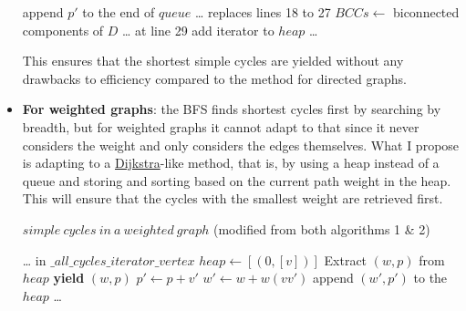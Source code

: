 \begin{itemize}
\begin{algorithm}[H]
\begin{algorithmic}
                  \State append $p'$ to the end of $queue$
                  \EndIf
                  \EndFor
                  \State \ldots
                  \State replaces lines 18 to 27
                  \State $BCCs \gets$ biconnected components of $D$
                  \State \ldots
                  \State at line 29
                  \State add iterator  to $heap$
                  \EndFor
                  \State \ldots
              \end{algorithmic}
          \end{algorithm}
          This ensures that the shortest simple cycles are yielded without any drawbacks to efficiency compared to the method for directed graphs.

    \item \textbf{For weighted graphs}:
          the BFS finds shortest cycles first by searching by breadth,
          but for weighted graphs it cannot adapt
          to that since it never considers the weight and only considers
          the edges themselves. What I propose is adapting to a \href{https://en.wikipedia.org/wiki/Dijkstra's_algorithm}{Dijkstra}-like method,
          that is, by using a heap instead of a queue and storing
          and sorting based on the current path weight in the heap.
          This will ensure that the cycles with the smallest weight are retrieved first.
          \begin{algorithm}[H]
              \caption{$simple\ cycles\ in\ a\ weighted\ graph$ (modified from both algorithms 1 \& 2)}
              \begin{algorithmic}
                  \State \ldots
                  \State in $\_all\_cycles\_iterator\_vertex$
                  \State $heap \gets [(0,[v])]$ 
                  \State Extract $(w,p)$ from $heap$
                  \State \textbf{yield} $(w,p)$
                  \Else
                  \State $p' \gets p + v'$
                  \State $w' \gets w + w(vv')$ 
                  \State append $(w',p')$ to the $heap$
                  \EndIf
                  \EndFor
                  \EndIf
                  \EndWhile
                  \State \ldots
              \end{algorithmic}
          \end{algorithm}
\end{itemize}

